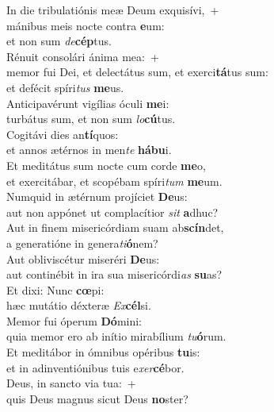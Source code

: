 \evenverse In die tribulatiónis meæ Deum exquisívi,~+\\\evenverse  mánibus meis nocte contra \textbf{e}um:~\*\\
\evenverse et non sum \textit{de}\textbf{cép}tus.\\
\oddverse Rénuit consolári ánima mea:~+\\
\oddverse  memor fui Dei, et delectátus sum, et exerci\textbf{tá}tus sum:~\*\\
\oddverse et defécit spíri\textit{tus} \textbf{me}us.\\
\evenverse Anticipavérunt vigílias óculi \textbf{me}i:~\*\\
\evenverse turbátus sum, et non sum \textit{lo}\textbf{cú}tus.\\
\oddverse Cogitávi dies an\textbf{tí}quos:~\*\\
\oddverse et annos ætérnos in men\textit{te} \textbf{há}\textbf{bu}i.\\
\evenverse Et meditátus sum nocte cum corde \textbf{me}o,~\*\\
\evenverse et exercitábar, et scopébam spíri\textit{tum} \textbf{me}um.\\
\oddverse Numquid in ætérnum projíciet \textbf{De}us:~\*\\
\oddverse aut non appónet ut complacítior \textit{sit} \textbf{a}dhuc?\\
\evenverse Aut in finem misericórdiam suam ab\textbf{scín}det,~\*\\
\evenverse a generatióne in genera\textit{ti}\textbf{ó}nem?\\
\oddverse Aut obliviscétur miseréri \textbf{De}us:~\*\\
\oddverse aut continébit in ira sua misericórdi\textit{as} \textbf{su}as?\\
\evenverse Et dixi: Nunc \textbf{cœ}pi:~\*\\
\evenverse hæc mutátio déxteræ \textit{Ex}\textbf{cél}si.\\
\oddverse Memor fui óperum \textbf{Dó}mini:~\*\\
\oddverse quia memor ero ab inítio mirabílium \textit{tu}\textbf{ó}rum.\\
\evenverse Et meditábor in ómnibus opéribus \textbf{tu}is:~\*\\
\evenverse et in adinventiónibus tuis e\textit{xer}\textbf{cé}bor.\\
\oddverse Deus, in sancto via tua:~+\\
\oddverse  quis Deus magnus sicut Deus \textbf{no}ster?~\*\\
